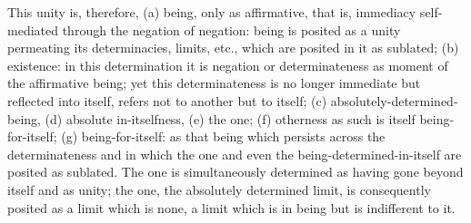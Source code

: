 This unity is, therefore,
(a) being, only as affirmative, that is,
immediacy self-mediated through the negation of negation:
being is posited as a unity permeating
its determinacies, limits, etc.,
which are posited in it as sublated;
(b) existence:
in this determination it is negation
or determinateness as moment of
the affirmative being;
yet this determinateness is no longer
immediate but reflected into itself,
refers not to another but to itself;
(c) absolutely-determined-being,
(d) absolute in-itselfness,
(e) the one;
(f) otherness as such is itself being-for-itself;
(g) being-for-itself:
as that being which persists across the determinateness
and in which the one and even the being-determined-in-itself
are posited as sublated.
The one is simultaneously determined
as having gone beyond itself and as unity;
the one, the absolutely determined limit,
is consequently posited as a limit which is none,
a limit which is in being but is indifferent to it.
